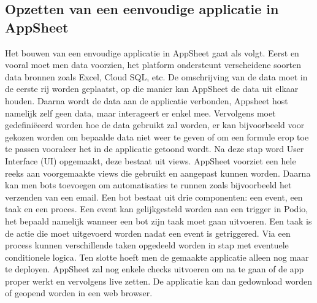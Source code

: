 \subsection{Opzetten van een eenvoudige applicatie in AppSheet}


Het bouwen van een envoudige applicatie in AppSheet gaat als volgt. Eerst en vooral moet men data voorzien, het platform ondersteunt verscheidene soorten data bronnen zoals Excel, Cloud SQL, etc. De omschrijving van de data moet in de eerste rij worden geplaatst, op die manier kan AppSheet de data uit elkaar houden. Daarna wordt de data aan de applicatie verbonden, Appsheet host namelijk zelf geen data, maar interageert er enkel mee. Vervolgens moet gedefiniëeerd worden hoe de data gebruikt zal worden, er kan bijvoorbeeld voor gekozen worden om bepaalde data niet weer te geven of om een formule erop toe te passen vooraleer het in de applicatie getoond wordt. Na deze stap word User Interface (UI) opgemaakt, deze bestaat uit views. AppSheet voorziet een hele reeks aan voorgemaakte views die gebruikt en aangepast kunnen worden.  Daarna kan men bots toevoegen om automatisaties te runnen zoals bijvoorbeeld het verzenden van een email. Een bot bestaat uit drie componenten: een event, een taak en een proces. Een event kan gelijkgesteld worden aan een trigger in Podio, het bepaald namelijk wanneer een bot zijn taak moet gaan uitvoeren. Een taak is de actie die moet uitgevoerd worden nadat een event is getriggered. Via een process kunnen verschillende taken opgedeeld worden in stap met eventuele conditionele logica. Ten slotte hoeft men de gemaakte applicatie alleen nog maar te deployen. AppSheet zal nog enkele checks uitvoeren om na te gaan of de app proper werkt en vervolgens live zetten. De applicatie kan dan gedownload worden of geopend worden in een web browser. 
\autocite{AppSheetHowToCreate}
